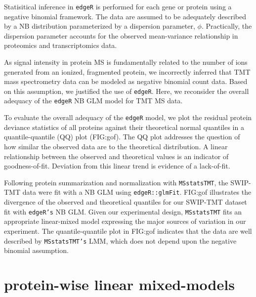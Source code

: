 \documentclass[11pt]{elife}\usepackage[]{graphicx}\usepackage[]{color}
\begin{document}
Statisitical inference in \texttt{edgeR} is performed for each gene or protein 
using a negative binomial framework. The data are assumed to 
be adequately described by a NB distribution parameterized by a dispersion 
parameter, $\phi$. Practically, the dispersion parameter accounts for the
observed mean-variance relationship in proteomics and transcriptomics data.

As signal intensity in protein MS is fundamentally related to the number of ions generated from
an ionized, fragmented protein, we incorrectly inferred that TMT
mass spectrometry data can be modeled as negative binomial count data. Based on
this assumption, we justified the use of \texttt{edgeR}.  Here, we reconsider
the overall adequacy of the \texttt{edgeR} NB GLM model for TMT MS data.

To evaluate the overall adequacy of the \texttt{edgeR} model, we plot the
residual protein deviance statistics of all proteins against their theoretical
normal quantiles in a quantile-quantile (QQ) plot (FIG:gof).  The QQ plot
addresses the question of how similar the observed data are to the theoretical
distribution.  A linear relationship between the observed and theoretical
values is an indicator of goodness-of-fit.  Deviation from this linear trend is
evidence of a lack-of-fit.

Following protein summarization and normalization with \texttt{MSstatsTMT}, the
SWIP-TMT data were fit with a NB GLM using \texttt{edgeR::glmFit}. FIG:gof
illustrates the divergence of the observed and theoretical quantiles for our
SWIP-TMT dataset fit with \texttt{edgeR's} NB GLM. Given our experimental
design, \texttt{MSstatsTMT} fits an appropriate linear-mixed model expressing
the major sources of variation in our experiment.  The quantile-quantile plot in
FIG:gof indicates that the data are well described by \texttt{MSstatsTMT's} LMM,
which does not depend upon the negative binomial assumption.


\section{protein-wise linear mixed-models}
\end{document}
